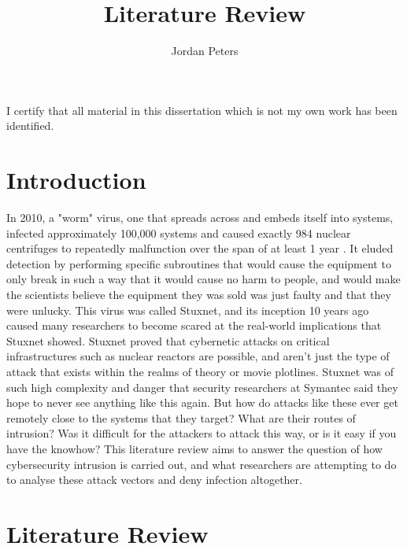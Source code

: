 \documentclass[a4paper, 11pt]{article}
\title{Literature Review}
\author{Jordan Peters}
\begin{document}
\begin{titlepage}
    \maketitle
    I certify that all material in this dissertation which is not my own work has been identified.
\end{titlepage}

\tableofcontents


\pagebreak


\section{Introduction}
In 2010, a "worm" virus, one that spreads across and embeds itself into systems, infected approximately 100,000 systems \cite{ref:stuxnet2011report} and caused exactly 984 nuclear centrifuges to repeatedly malfunction \cite{ref:singer2014cybersecurity} over the span of at least 1 year \cite{ref:stuxnet2011report}. It eluded detection by performing specific subroutines that would cause the equipment to only break in such a way that it would cause no harm to people, and would make the scientists believe the equipment they was sold was just faulty and that they were unlucky. \cite{ref:singer2014cybersecurity} This virus was called Stuxnet, and its inception 10 years ago caused many researchers to become scared at the real-world implications that Stuxnet showed. \cite{ref:stuxnet2011report}\cite{ref:singer2014cybersecurity} Stuxnet proved that cybernetic attacks on critical infrastructures such as nuclear reactors are possible, and aren't just the type of attack that exists within the realms of theory or movie plotlines. \cite{ref:stuxnet2011report} Stuxnet was of such high complexity and danger that security researchers at Symantec said they hope to never see anything like this again. \cite{ref:stuxnet2011report} But how do attacks like these ever get remotely close to the systems that they target? What are their routes of intrusion? Was it difficult for the attackers to attack this way, or is it easy if you have the knowhow? This literature review aims to answer the question of how cybersecurity intrusion is carried out, and what researchers are attempting to do to analyse these attack vectors and deny infection altogether.

\section{Literature Review}
\end{document}

